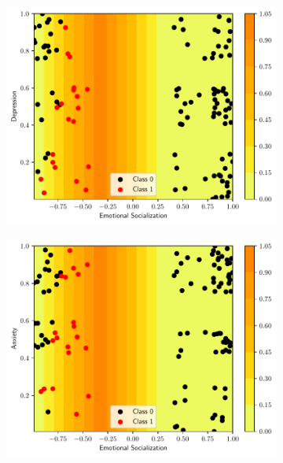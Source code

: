 \begin{figure}
    \begin{subfigure}[b]{0.32\textwidth}
        \centering
        \includegraphics[width=\textwidth]{figs/tree-contour-2-3.pdf}
        \caption{}
    \end{subfigure}
    \begin{subfigure}[b]{0.32\textwidth}
        \centering
        \includegraphics[width=\textwidth]{figs/tree-contour-2-4.pdf}
        \caption{}
    \end{subfigure}
    \begin{subfigure}[b]{0.32\textwidth}
        \centering

\end{subfigure}
\end{figure}
